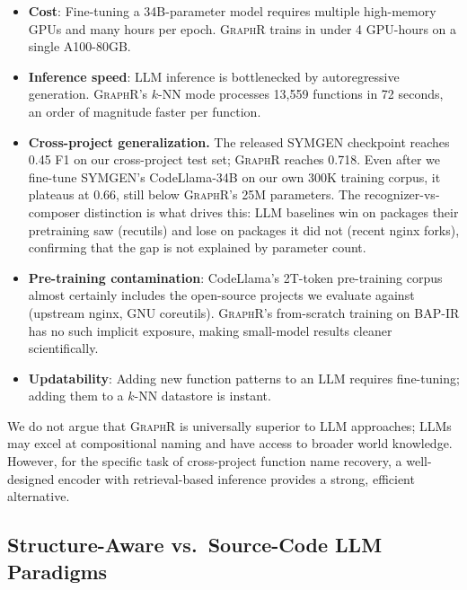 \documentclass[sigconf,nonacm]{acmart}
\newcommand{\sysname}{\textsc{GraphR}}
\begin{document}
\begin{itemize}
    \item \textbf{Cost}: Fine-tuning a 34B-parameter model requires multiple high-memory GPUs and many hours per epoch. \sysname{} trains in under 4 GPU-hours on a single A100-80GB.
    \item \textbf{Inference speed}: LLM inference is bottlenecked by autoregressive generation. \sysname{}'s $k$-NN mode processes 13{,}559 functions in 72 seconds, an order of magnitude faster per function.
    \item \textbf{Cross-project generalization.} The released SYMGEN checkpoint reaches 0.45 F1 on our cross-project test set; \sysname{} reaches 0.718. Even after we fine-tune SYMGEN's CodeLlama-34B on our own 300K training corpus, it plateaus at 0.66, still below \sysname{}'s 25M parameters. The recognizer-vs-composer distinction is what drives this: LLM baselines win on packages their pretraining saw (recutils) and lose on packages it did not (recent nginx forks), confirming that the gap is not explained by parameter count.
    \item \textbf{Pre-training contamination}: CodeLlama's 2T-token pre-training corpus almost certainly includes the open-source projects we evaluate against (upstream nginx, GNU coreutils). \sysname{}'s from-scratch training on BAP-IR has no such implicit exposure, making small-model results cleaner scientifically.
    \item \textbf{Updatability}: Adding new function patterns to an LLM requires fine-tuning; adding them to a $k$-NN datastore is instant.
\end{itemize}

We do not argue that \sysname{} is universally superior to LLM approaches; LLMs may excel at compositional naming and have access to broader world knowledge. However, for the specific task of cross-project function name recovery, a well-designed encoder with retrieval-based inference provides a strong, efficient alternative.

\subsection{Structure-Aware vs.\ Source-Code LLM Paradigms}
\label{sec:paradigms}
\end{document}

